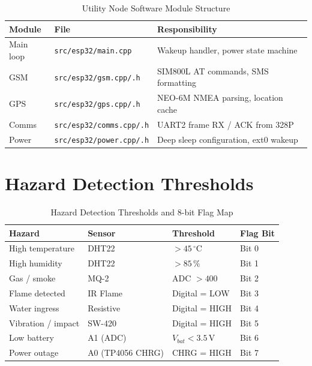 \documentclass[12pt,a4paper]{article}
\begin{document}
\begin{table}[H]
\centering
\begin{tabular}{@{} L{2.4cm} L{5cm} L{5cm} @{}}
\toprule
\textbf{Module}  & \textbf{File}                       & \textbf{Responsibility}                    \\
\midrule
Main loop        & \texttt{src/esp32/main.cpp}         & Wakeup handler, power state machine        \\
GSM              & \texttt{src/esp32/gsm.cpp/.h}       & SIM800L AT commands, SMS formatting        \\
GPS              & \texttt{src/esp32/gps.cpp/.h}       & NEO-6M NMEA parsing, location cache        \\
Comms            & \texttt{src/esp32/comms.cpp/.h}     & UART2 frame RX / ACK from 328P             \\
Power            & \texttt{src/esp32/power.cpp/.h}     & Deep sleep configuration, ext0 wakeup      \\
\bottomrule
\end{tabular}
\caption{Utility Node Software Module Structure}
\end{table}

\section{Hazard Detection Thresholds}

\begin{table}[H]
\centering
\begin{tabular}{@{} L{3.5cm} L{2.5cm} L{3.5cm} C{2cm} @{}}
\toprule
\textbf{Hazard}       & \textbf{Sensor}  & \textbf{Threshold}          & \textbf{Flag Bit} \\
\midrule
High temperature      & DHT22            & $> 45\,^{\circ}$C           & Bit 0 \\
High humidity         & DHT22            & $> 85\,\%$                  & Bit 1 \\
Gas / smoke           & MQ-2             & ADC $> 400$                 & Bit 2 \\
Flame detected        & IR Flame         & Digital = LOW               & Bit 3 \\
Water ingress         & Resistive        & Digital = HIGH              & Bit 4 \\
Vibration / impact    & SW-420           & Digital = HIGH              & Bit 5 \\
Low battery           & A1 (ADC)         & $V_{bat} < 3.5\,\text{V}$   & Bit 6 \\
Power outage          & A0 (TP4056 CHRG) & CHRG = HIGH                 & Bit 7 \\
\bottomrule
\end{tabular}
\caption{Hazard Detection Thresholds and 8-bit Flag Map}
\end{table}
\end{document}
